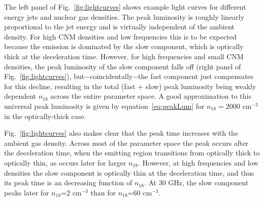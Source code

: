 \documentclass[usenatbib,fleqn]{mnras}
\begin{document}
The left panel of Fig.~\ref{fig:lightcurves} shows example light
curves for different energy jets and nuclear gas densities. The peak
luminosity is roughly linearly proportional to the jet energy and is
virtually independent of the ambient density.  For high CNM densities
and low frequencies this is to be expected because the emission is
dominated by the slow component, which is optically thick at the
deceleration time.  However, for high frequencies and small CNM
densities, the peak luminosity of the slow component falls off (right
panel of Fig.~\ref{fig:lightcurves}), but$-$coincidentally$-$the fast
component just compensates for this decline, resulting in the total
(fast + slow) peak luminosity being weakly dependent $n_{18}$
across the entire parameter space.  A good approximation to this
universal peak luminosity is given by equation~\ref{eq:peakLum} for
$n_{18}=2000$ cm$^{-3}$ in the optically-thick case.

Fig.~\ref{fig:lightcurves} also makes clear that the peak time
increases with the ambient gas density.  Across most of the parameter
space the peak occurs after the deceleration time, when the emitting
region transitions from optically thick to optically thin, as occurs
later for larger $n_{18}$. However, at high frequencies and low
densities the slow component is optically thin at the deceleration
time, and thus its peak time is an decreasing function of $n_{18}$. At
30 GHz, the slow component peaks later for $n_{18}$=2 cm$^{-3}$ than
for $n_{18}$=60 cm$^{-3}$.
\end{document}
